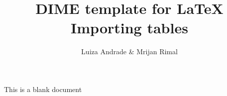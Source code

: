 \documentclass{article}                 %
\title{DIME template for \LaTeX \\ Importing tables} 	%
\author{Luiza Andrade \& Mrijan Rimal}
\date{}                    							%
\begin{document}

	This is a blank document
\end{document}
